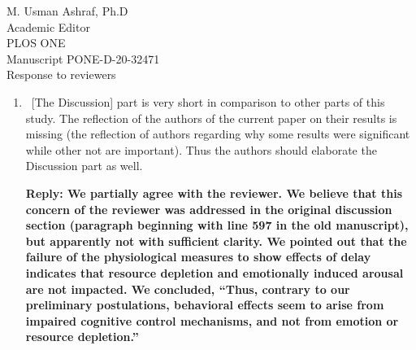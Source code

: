 \documentclass[10pt, letterpaper]{letter}
\newenvironment{QandA}
{\begin{enumerate}[
    label={\bfseries Comment \arabic*:}, 
    wide,
    ref={Comment \arabic*}]}
{\end{enumerate}}
\newenvironment{revised}[2]
{%
\begin{displayquote}
    \medskip
    \begin{flushright}
        \itshape{(Lines \numrange{#1}{#2} in the revised manuscript.)}\normalfont%
    \end{flushright}
    \medskip

}
{\end{displayquote}}
\newenvironment{answered}
{\medskip\par\bfseries Reply: \normalfont}
{\par\noindent\makebox[\linewidth]{\rule{\textwidth}{0.4pt}}\bigskip}
\begin{document}
\begin{letter}{
    M. Usman Ashraf, Ph.D\\
    Academic Editor\\
    PLOS ONE\\
    \medskip
    Manuscript PONE-D-20-32471\\
    Response to reviewers\\
}
\begin{QandA}
\begin{answered}
\begin{revised}{357}{385}
            The E4 wristband was chosen due to its small, non-invasive, and wireless form factor (samples were streamed to the system over Bluetooth LE) and for the fact that its use in research has been experimentally validated in previous studies~\autocite{ragot2017emotion, mccarthy2016validation}.
            The E4 also includes a skin temperature thermometer, however the measure was not used for the present study.\\

            For the EEG data we employed the OpenBCI EEG Headband Kit\autocite{openbci:headbandkit} consisting of a number of dry electrodes fastened to a Velcro headband.
            It provides a quick and non-invasive way of obtaining EEG signals from participants.
            Electrodes were placed according to the \emph{10--20 Electrode System}~\autocite{eeg1020system:1961} on the \emph{Fp1} and \emph{Fp2} points, in order to capture brain activity in the frontal lobe, with ground and reference electrodes on the right and left earlobes, respectively.
            The signals were sampled at \SI{200}{\hertz} and postprocessed to 
        \end{revised}
    \end{answered}

    \item\ [The Discussion] part is very short in comparison to other parts of this study.
    The reflection of the authors of the current paper on their results is missing (the reflection of authors regarding why some results were significant while other not are important).
    Thus the authors should elaborate the Discussion part as well.
    
    \begin{answered}
        We partially agree with the reviewer.
        We believe that  this concern of the reviewer was addressed in the original discussion section (paragraph beginning with line 597 in the old manuscript), but apparently not with sufficient clarity.
        We pointed out that the failure of the physiological measures to show effects of delay indicates that resource depletion and emotionally induced arousal  are not impacted.
        We concluded, ``Thus, contrary to our preliminary postulations, behavioral effects seem to arise from impaired cognitive control mechanisms, and not from emotion or resource depletion.''


\end{answered}
\end{QandA}
\end{letter}
\end{document}

